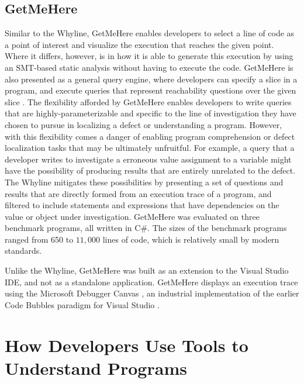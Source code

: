 \subsection{GetMeHere}
\label{subsec:GetMeHere}

\par Similar to the Whyline, GetMeHere enables developers to select a line of 
code as a point of interest and visualize the execution that reaches the given 
point.
Where it differs, however, is in how it is able to generate this execution
by using an SMT-based static analysis \cite{barnett-2014-get} without having to
execute the code.
GetMeHere is also presented as a general query engine, where developers can
specify a slice in a program, and execute queries that represent reachability
questions over the given slice \cite{barnett-2014-get}.
The flexibility afforded by GetMeHere enables developers to write queries that 
are highly-parameterizable and specific to the line of investigation they have
chosen to pursue in localizing a defect or understanding a program.
However, with this flexibility comes a danger of enabling program comprehension
or defect localization tasks that may be ultimately unfruitful.
For example, a query that a developer writes to investigate a erroneous value
assignment to a variable might have the possibility of producing results that 
are entirely unrelated to the defect.
The Whyline mitigates these possibilities by presenting a set of questions
and results that are directly formed from an execution trace of a program, and
filtered to include statements and expressions that have dependencies on the
value or object under investigation.
GetMeHere was evaluated on three benchmark programs, all written in C\#.
The sizes of the benchmark programs ranged from 650 to $11,000$ lines of code,
which is relatively small by modern standards.

\par Unlike the Whyline, GetMeHere was built as an extension to the Visual
Studio \ac{IDE}, and not as a standalone application.
GetMeHere displays an execution trace using the Microsoft Debugger Canvas 
\cite{bragdon-2012-canvas}, an industrial implementation of the earlier 
Code Bubbles \cite{bragdon-2010-code-bubbles} paradigm for Visual Studio
\cite{barnett-2014-get}.

\section{How Developers Use Tools to Understand Programs}
\label{sec:HowDevelopersUseToolsToUnderstandPrograms}

